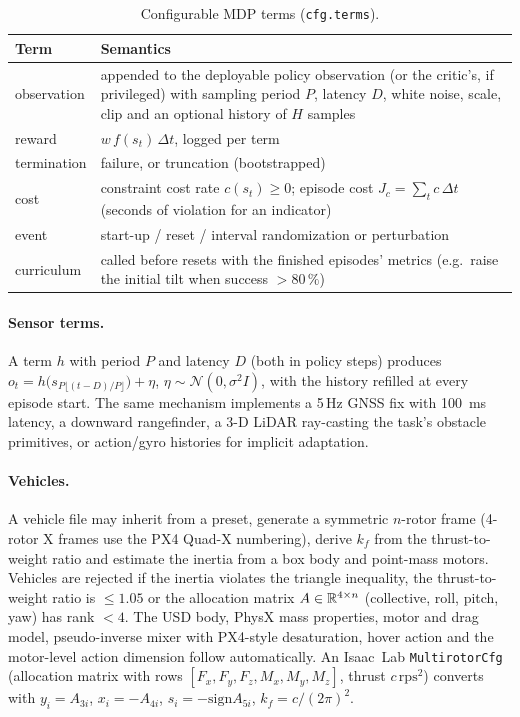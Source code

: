 \begin{table}[!htbp]\centering\small
\caption{Configurable MDP terms (\texttt{cfg.terms}).}\label{tab:terms}
\begin{tabularx}{\linewidth}{lX}\toprule
Term & Semantics\\\midrule
observation & appended to the deployable policy observation (or the critic's, if privileged) with sampling period
$P$, latency $D$, white noise, scale, clip and an optional history of $H$ samples\\
reward & $w\,f(s_t)\,\Delta t$, logged per term\\
termination & failure, or truncation (bootstrapped)\\
cost & constraint cost rate $c(s_t)\ge0$; episode cost $J_c=\sum_t c\,\Delta t$ (seconds of violation for an indicator)\\
event & start-up / reset / interval randomization or perturbation\\
curriculum & called before resets with the finished episodes' metrics (e.g.\ raise the initial tilt when success $>80\,\%$)\\
\bottomrule\end{tabularx}
\end{table}

\paragraph{Sensor terms.} A term $h$ with period $P$ and latency $D$ (both in policy steps) produces
$o_t=h\big(s_{P\lfloor (t-D)/P\rfloor}\big)+\eta$, $\eta\sim\mathcal N(0,\sigma^2 I)$, with the history refilled at
every episode start. The same mechanism implements a 5\,Hz GNSS fix with \SI{100}{ms} latency, a downward rangefinder,
a 3-D LiDAR ray-casting the task's obstacle primitives, or action/gyro histories for implicit adaptation.

\paragraph{Vehicles.} A vehicle file may inherit from a preset, generate a symmetric $n$-rotor frame (4-rotor X frames
use the PX4 Quad-X numbering), derive $k_f$ from the thrust-to-weight ratio and estimate the inertia from a box body
and point-mass motors. Vehicles are rejected if the inertia violates the triangle inequality, the thrust-to-weight
ratio is $\le1.05$ or the allocation matrix $A\in\mathbb{R}^{4\times n}$ (collective, roll, pitch, yaw) has rank $<4$. The
USD body, PhysX mass properties, motor and drag model, pseudo-inverse mixer with PX4-style desaturation, hover action
and the motor-level action dimension follow automatically. An Isaac~Lab \texttt{MultirotorCfg} (allocation matrix with
rows $[F_x,F_y,F_z,M_x,M_y,M_z]$, thrust $c\,\mathrm{rps}^2$) converts with $y_i=A_{3i}$, $x_i=-A_{4i}$,
$s_i=-\mathrm{sign}A_{5i}$, $k_f=c/(2\pi)^2$.

